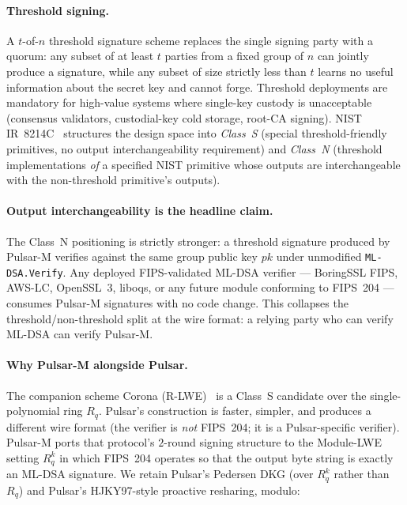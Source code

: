 \documentclass[11pt,a4paper]{article}
\theoremstyle{definition}
\theoremstyle{remark}
\newcommand{\Rq}{R_q}
\begin{document}
\paragraph{Threshold signing.}
A $t$-of-$n$ threshold signature scheme replaces the single signing
party with a quorum: any subset of at least $t$ parties from a fixed
group of $n$ can jointly produce a signature, while any subset of
size strictly less than $t$ learns no useful information about the
secret key and cannot forge. Threshold deployments are mandatory for
high-value systems where single-key custody is unacceptable
(consensus validators, custodial-key cold storage, root-CA signing).
NIST IR~8214C~\cite{nist-ir-8214c} structures the design space into
\emph{Class~S} (special threshold-friendly primitives, no output
interchangeability requirement) and \emph{Class~N} (threshold
implementations \emph{of} a specified NIST primitive whose outputs
are interchangeable with the non-threshold primitive's outputs).

\paragraph{Output interchangeability is the headline claim.}
The Class~N positioning is strictly stronger: a threshold signature
produced by Pulsar-M verifies against the same group public key
$\mathit{pk}$ under unmodified \texttt{ML-DSA.Verify}. Any deployed
FIPS-validated ML-DSA verifier --- BoringSSL FIPS, AWS-LC, OpenSSL~3,
liboqs, or any future module conforming to FIPS~204 --- consumes
Pulsar-M signatures with no code change. This collapses the
threshold/non-threshold split at the wire format: a relying party
who can verify ML-DSA can verify Pulsar-M.

\paragraph{Why Pulsar-M alongside Pulsar.}
The companion scheme Corona (R-LWE)~\cite{boschini2024corona} is a
Class~S candidate over the single-polynomial ring $\Rq$. Pulsar's
construction is faster, simpler, and produces a different wire
format (the verifier is \emph{not} FIPS~204; it is a Pulsar-specific
verifier). Pulsar-M ports that protocol's $2$-round signing structure
to the Module-LWE setting $\Rq^k$ in which FIPS~204 operates so that
the output byte string is exactly an ML-DSA signature. We retain
Pulsar's Pedersen DKG (over $\Rq^k$ rather than $\Rq$) and Pulsar's
HJKY97-style proactive resharing, modulo:
\end{document}
